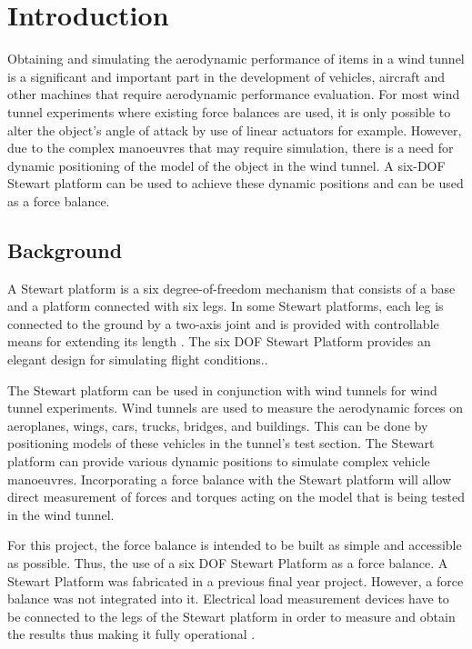 \section{Introduction}
\label{sec:introduction}
Obtaining and simulating the aerodynamic performance of items in a wind tunnel is a
significant and important part in the development of vehicles, aircraft and other machines
that require aerodynamic performance evaluation. For most wind tunnel experiments where existing force balances are used,
it is only possible to alter the object's angle of attack by use of linear  actuators for example.
However, due to the complex manoeuvres that
may require simulation, there is a need for dynamic positioning of the model of the object
in the wind tunnel. A six-DOF Stewart platform can be used to achieve these dynamic positions and can be used as a force balance.
\subsection{Background}
A Stewart platform is a six degree-of-freedom mechanism that consists of a base and a platform connected with six legs. In some Stewart platforms,
each leg is connected to the ground by a two-axis joint and is provided with controllable means for extending its length
\cite{wittenburg2016stewart}. The six DOF Stewart Platform provides an elegant design for simulating flight conditions.\cite{stewart1965platform}.

The Stewart platform can be used in conjunction with wind tunnels for wind tunnel experiments. Wind tunnels are used to measure the aerodynamic forces on aeroplanes, wings, cars, trucks, bridges, and buildings. This can be done by positioning models of these vehicles in the tunnel's test section.
The Stewart platform can provide various dynamic positions to simulate complex vehicle manoeuvres. Incorporating a force balance with the Stewart platform will allow direct measurement of forces and torques acting on the model that is being tested in the wind tunnel.

For this project, the force balance is intended to be built as simple and accessible as possible. Thus, the use of a six DOF Stewart Platform as a force balance.
A Stewart Platform was fabricated in a previous final year project. However, a force balance was not integrated into it.
Electrical load measurement devices have to be connected to the legs of the Stewart platform in order to measure and obtain the results thus making it fully operational \cite{caleb}.

